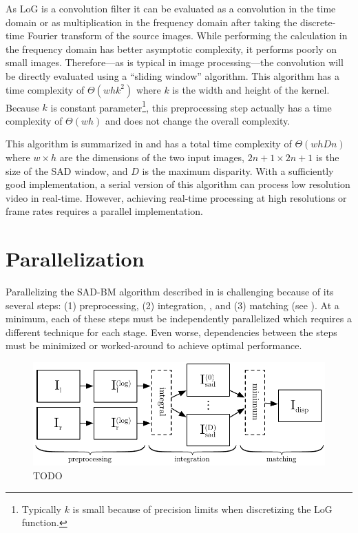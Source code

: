 \documentclass{article}
\begin{document}
As LoG is a convolution filter it can be evaluated as a convolution in the time
domain or as multiplication in the frequency domain after taking the
discrete-time Fourier transform of the source images. While performing the
calculation in the frequency domain has better asymptotic complexity, it
performs poorly on small images. Therefore---as is typical in image
processing---the convolution will be directly evaluated using a ``sliding
window'' algorithm. This algorithm has a time complexity of $\Theta(whk^2)$
where $k$ is the width and height of the kernel. Because $k$ is constant
parameter\footnote{Typically $k$ is small because of precision limits when
discretizing the LoG function.}, this preprocessing step actually has a time
complexity of $\Theta(wh)$ and does not change the overall complexity.

This algorithm is summarized in  and has a total time
complexity of $\Theta(whDn)$ where $w \times h$ are the dimensions of the two
input images, $2n + 1 \times 2n + 1$ is the size of the SAD window, and $D$ is
the maximum disparity. With a sufficiently good implementation, a serial
version of this algorithm can process low resolution video in real-time.
However, achieving real-time processing at high resolutions or frame rates
requires a parallel implementation.

\section{Parallelization}
\label{sec:parallel}
Parallelizing the SAD-BM algorithm described in  is
challenging because of its several steps: (1) preprocessing, (2) integration, ,
and (3) matching (see ). At a minimum, each of these steps
must be independently parallelized which requires a different technique for
each stage. Even worse, dependencies between the steps must be minimized or
worked-around to achieve optimal performance.

\begin{figure}
    \centering
    \includegraphics[width=\textwidth]{figures/pipeline}
    \caption{
        TODO
    }
    \label{fig:pipeline}
\end{figure}
\end{document}

